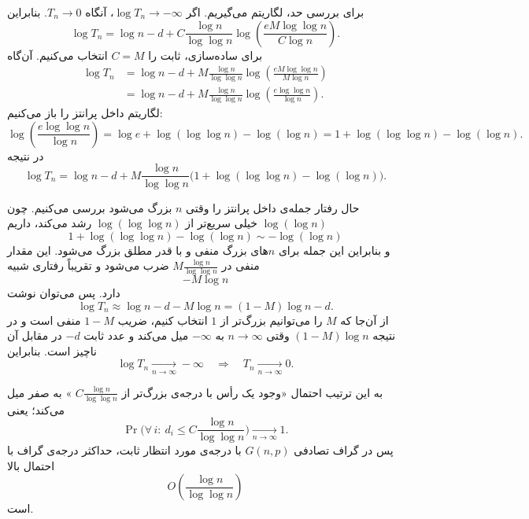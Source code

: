 برای بررسی حد، لگاریتم می‌گیریم. اگر
$\log T_n \to -\infty$،
آنگاه $T_n \to 0$. بنابراین
\[
\log T_n
=
\log n - d
+
C \frac{\log n}{\log\log n}
\log\!\left(
\frac{e M \log\log n}{C \log n}
\right).
\]
برای ساده‌سازی، ثابت را
$C = M$
انتخاب می‌کنیم. آن‌گاه
\begin{align*}
\log T_n
&=
\log n - d
+
M \frac{\log n}{\log\log n}
\log\!\left(
\frac{e M \log\log n}{M \log n}
\right) \\
&=
\log n - d
+
M \frac{\log n}{\log\log n}
\log\!\left(
\frac{e \log\log n}{\log n}
\right).
\end{align*}
لگاریتم داخل پرانتز را باز می‌کنیم:
\[
\log\!\left(
\frac{e \log\log n}{\log n}
\right)
= \log e + \log(\log\log n) - \log(\log n)
= 1 + \log(\log\log n) - \log(\log n).
\]
در نتیجه
\[
\log T_n
=
\log n - d
+
M \frac{\log n}{\log\log n}
\big(1 + \log(\log\log n) - \log(\log n)\big).
\]

حال رفتار جمله‌ی داخل پرانتز را وقتی $n$ بزرگ می‌شود بررسی می‌کنیم. چون
$\log(\log n)$
خیلی سریع‌تر از
$\log(\log\log n)$
رشد می‌کند، داریم
\[
1 + \log(\log\log n) - \log(\log n) \sim - \log(\log n)
\]
و بنابراین این جمله برای $n$های بزرگ منفی و با قدر مطلق بزرگ می‌شود. این مقدار منفی در
$M \frac{\log n}{\log\log n}$
ضرب می‌شود و تقریباً رفتاری شبیه
\[
- M \log n
\]
دارد. پس می‌توان نوشت
\[
\log T_n
\approx
\log n - d - M \log n
= (1 - M)\log n - d.
\]
از آن‌جا که $M$ را می‌توانیم بزرگ‌تر از $1$ انتخاب کنیم، ضریب
$1 - M$
منفی است و در نتیجه
$(1 - M)\log n$
وقتی $n \to \infty$ به $-\infty$ میل می‌کند و عدد ثابت $-d$ در مقابل آن ناچیز است. بنابراین
\[
\log T_n \xrightarrow[n\to\infty]{} -\infty
\quad\Rightarrow\quad
T_n \xrightarrow[n\to\infty]{} 0.
\]

به این ترتیب احتمال «وجود یک رأس با درجه‌ی بزرگ‌تر از
$C \frac{\log n}{\log\log n}$
» به صفر میل می‌کند؛ یعنی
\[
\Pr\Big(\forall\, i:\ d_i \le C \frac{\log n}{\log\log n}\Big)
\xrightarrow[n\to\infty]{} 1.
\]
پس در گراف تصادفی $G(n,p)$ با درجه‌ی مورد انتظار ثابت، حداکثر درجه‌ی گراف با احتمال بالا
\[
O\!\left(\frac{\log n}{\log\log n}\right)
\]
است.
